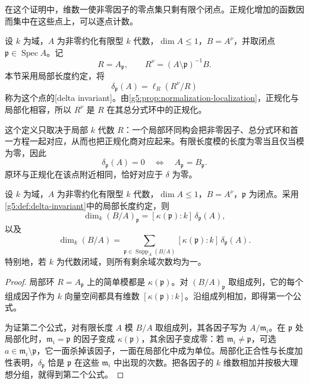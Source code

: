 在这个证明中，维数一使非零因子的零点集只剩有限个闭点。正规化增加的函数因而集中在这些点上，可以逐点计数。

\begin{definition}\label{g5:def:delta-invariant}
	设 \(k\) 为域，\(A\) 为非零约化有限型 \(k\) 代数，\(\dim A\leq1\)，\(B=A^\nu\)，并取闭点 \(\mathfrak p\in\operatorname{Spec}A\)。记
	\[
	R=A_{\mathfrak p},\qquad
	R^\nu=(A\setminus\mathfrak p)^{-1}B.
	\]
	本节采用局部长度约定，将
	\[
	\delta_{\mathfrak p}(A)
	=\ell_R(R^\nu/R)
	\]
	称为这个点的[delta invariant]。由\cref{g5:prop:normalization-localization}，正规化与局部化相容，所以 \(R^\nu\) 是 \(R\) 在其总分式环中的正规化。
\end{definition}

这个定义只取决于局部 \(k\) 代数 \(R\)：一个局部环同构会把非零因子、总分式环和首一方程一起对应，从而也把正规化商对应起来。有限长度模的长度为零当且仅当模为零，因此
\[
	\delta_{\mathfrak p}(A)=0
	\quad\Longleftrightarrow\quad
	A_{\mathfrak p}=B_{\mathfrak p}.
\]
原环与正规化在该点附近相同，恰好对应于 \(\delta\) 为零。

\begin{proposition}\label{g5:prop:delta-residue-degree}
	设 \(k\) 为域，\(A\) 为非零约化有限型 \(k\) 代数，\(\dim A\leq1\)，\(B=A^\nu\)，\(\mathfrak p\) 为闭点。采用\cref{g5:def:delta-invariant}中的局部长度约定，则
	\[
	\dim_k(B/A)_{\mathfrak p}
	=[\kappa(\mathfrak p):k]\,\delta_{\mathfrak p}(A),
	\]
	以及
	\[
	\dim_k(B/A)
	=\sum_{\mathfrak p\in\operatorname{Supp}_A(B/A)}
	[\kappa(\mathfrak p):k]\,\delta_{\mathfrak p}(A).
	\]
	特别地，若 \(k\) 为代数闭域，则所有剩余域次数均为一。
\end{proposition}
\begin{proof}
	局部环 \(R=A_{\mathfrak p}\) 上的简单模都是 \(\kappa(\mathfrak p)\)。对 \((B/A)_{\mathfrak p}\) 取组成列，它的每个组成因子作为 \(k\) 向量空间都具有维数 \([\kappa(\mathfrak p):k]\)。沿组成列相加，即得第一个公式。

	为证第二个公式，对有限长度 \(A\) 模 \(B/A\) 取组成列，其各因子写为 \(A/\mathfrak m_i\)。在 \(\mathfrak p\) 处局部化时，\(\mathfrak m_i=\mathfrak p\) 的因子变成 \(\kappa(\mathfrak p)\)，其余因子变成零：若 \(\mathfrak m_i\ne\mathfrak p\)，可选 \(a\in\mathfrak m_i\setminus\mathfrak p\)，它一面杀掉该因子，一面在局部化中成为单位。局部化正合性与长度加性表明，\(\delta_{\mathfrak p}\) 恰是 \(\mathfrak p\) 在这些 \(\mathfrak m_i\) 中出现的次数。把各因子的 \(k\) 维数相加并按极大理想分组，就得到第二个公式。
\end{proof}

